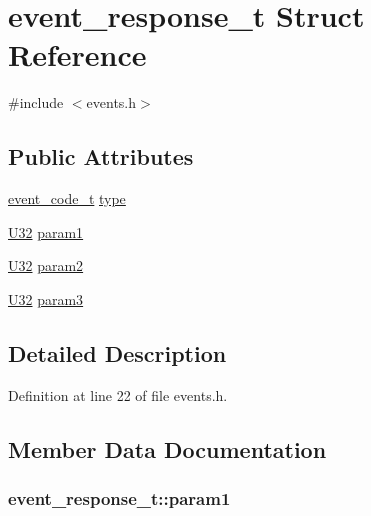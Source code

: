 \hypertarget{structevent__response__t}{}\section{event\+\_\+response\+\_\+t Struct Reference}
\label{structevent__response__t}


{\ttfamily \#include $<$events.\+h$>$}

\subsection*{Public Attributes}
\begin{DoxyCompactItemize}
\item 
\hyperlink{events_8h_abe76c8b0c12719809ba99859f3b4ec57}{event\+\_\+code\+\_\+t} \hyperlink{structevent__response__t_a33850f7c5bcc5c05693bd15be488d34a}{type}
\item 
\hyperlink{openal__internal__common_8h_ac3df7cf3c8cb172a588adec881447d68}{U32} \hyperlink{structevent__response__t_a7d05e94a0ceb0a81965cdb8ed8a20125}{param1}
\item 
\hyperlink{openal__internal__common_8h_ac3df7cf3c8cb172a588adec881447d68}{U32} \hyperlink{structevent__response__t_ac640c8192ad38f108bf2063f70f29c3f}{param2}
\item 
\hyperlink{openal__internal__common_8h_ac3df7cf3c8cb172a588adec881447d68}{U32} \hyperlink{structevent__response__t_a8e8609565de053bdd9b9a02f9a877819}{param3}
\end{DoxyCompactItemize}


\subsection{Detailed Description}


Definition at line 22 of file events.\+h.



\subsection{Member Data Documentation}
\subsubsection[{\texorpdfstring{param1}{param1}}]{ event\+\_\+response\+\_\+t\+::param1}\hypertarget{structevent__response__t_a7d05e94a0ceb0a81965cdb8ed8a20125}{}\label{structevent__response__t_a7d05e94a0ceb0a81965cdb8ed8a20125}


